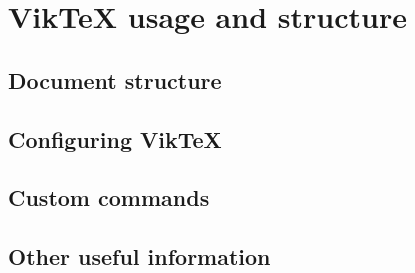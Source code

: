 
\chapter{VikTeX usage and structure}
\label{intro}

\section{Document structure}

\section{Configuring VikTeX}

\section{Custom commands}

\section{Other useful information}


\cleardoublepage

